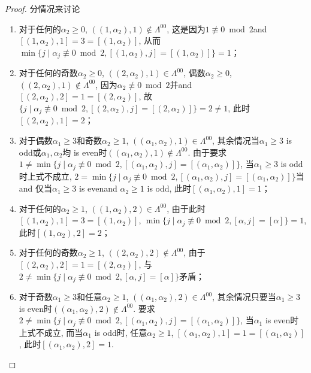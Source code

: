 \begin{proof}
分情况来讨论
\begin{enumerate}
	\item 对于任何的$\alpha_2\geq 0$,  $((1,\alpha_2),1) \not \in \Lambda^{00}$, 这是因为$1\not\equiv 0 \bmod 2$and $[(1,\alpha_2),1]=3=[(1,\alpha_2)]$, 从而$\min\{j\mid \alpha_j\not\equiv 0 \bmod 2,[(1,\alpha_2),j]=[(1,\alpha_2)]\}=1$；
	\item 对于任何的奇数$\alpha_2\geq 0$, $((2,\alpha_2),1) \in \Lambda^{00}$, 偶数$\alpha_2\geq 0$, $((2,\alpha_2),1) \not \in \Lambda^{00}$,  因为$\alpha_2\not\equiv 0 \bmod 2$并and $[(2,\alpha_2),2]=1=[(2,\alpha_2)]$, 故$\{j\mid \alpha_j\not\equiv 0 \bmod 2,[(2,\alpha_2),j]=[(2,\alpha_2)]\}=2\neq 1$, 此时$[(2,\alpha_2),1]=2$；
	\item 对于偶数$\alpha_1\geq 3$和奇数$\alpha_2\geq 1$, $((\alpha_1,\alpha_2),1)  \in \Lambda^{00}$, 其余情况当$\alpha_1\geq 3$ is odd或$\alpha_1,\alpha_2$均 is even时$((\alpha_1,\alpha_2),1) \not  \in \Lambda^{00}$. 由于要求$1\neq \min\{j\mid \alpha_j\not\equiv 0 \bmod 2,[(\alpha_1,\alpha_2),j]=[(\alpha_1,\alpha_2)]\}$, 当$\alpha_1\geq 3$ is odd时上式不成立, $2= \min\{j\mid \alpha_j\not\equiv 0 \bmod 2,[(\alpha_1,\alpha_2),j]=[(\alpha_1,\alpha_2)]\}$当and 仅当$\alpha_1\geq 3$ is evenand $\alpha_2\geq 1$ is odd, 此时$[(\alpha_1,\alpha_2),1]=1$；
	\item 对于任何的$\alpha_2\geq 1$,  $((1,\alpha_2),2) \in \Lambda^{00}$, 由于此时$[(1,\alpha_2),1]=3=[(1,\alpha_2)]$, $\min\{j\mid \alpha_j\not\equiv 0 \bmod 2,[\alpha,j]=[\alpha]\}=1$, 此时$[(1,\alpha_2),2]=2$；
	\item 对于任何的奇数$\alpha_2\geq 1$,  $((2,\alpha_2),2) \not \in \Lambda^{00}$, 由于$[(2,\alpha_2),2]=1=[(2,\alpha_2)]$, 与$2\neq \min\{j\mid \alpha_j\not\equiv 0 \bmod 2,[\alpha,j]=[\alpha]\}$矛盾；
	\item 对于奇数$\alpha_1\geq 3$和任意$\alpha_2\geq 1 $, $((\alpha_1,\alpha_2),2)  \in \Lambda^{00}$, 其余情况只要当$\alpha_1\geq 3$ is even时$((\alpha_1,\alpha_2),2) \not  \in \Lambda^{00}$. 要求$2\neq \min\{j\mid \alpha_j\not\equiv 0 \bmod 2,[(\alpha_1,\alpha_2),j]=[(\alpha_1,\alpha_2)]\}$, 当$\alpha_1$ is even时上式不成立, 而当$\alpha_1$ is odd时, 任意$\alpha_2\geq 1$, $[(\alpha_1,\alpha_2),1]=1=[(\alpha_1,\alpha_2)]$, 此时$[(\alpha_1,\alpha_2),2]=1$. 
\end{enumerate}




\end{proof}
